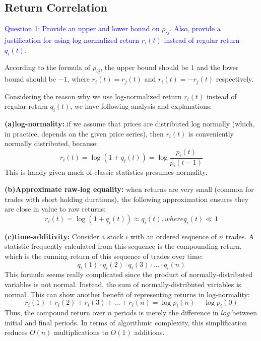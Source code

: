 \documentclass[11pt]{article}
\begin{document}
\subsection{Return Correlation}
\textcolor{blue}{Question 1: Provide an upper and lower bound on $\rho_{ij}$. Also, provide a justification for using log-normalized return $r_i(t)$ instead of regular return $q_i(t)$.}

According to the formula of $\rho_{ij}$, the upper bound should be $1$ and the lower bound should be $-1$, where $r_i(t) = r_j(t)$ and $r_i(t) = -r_j(t)$ respectively.

Considering the reason why we use log-normalized return $r_i(t)$ instead of regular return $q_i(t)$, we have following analysis and explanations:

\textbf{(a)log-normality:} if we assume that prices are distributed log normally (which, in practice, depends on the given price series), then $r_i(t)$ is conveniently normally distributed, because:
\begin{displaymath}r_i(t) = \log(1 + q_i(t)) = \log\frac{p_i(t)}{p_i(t-1)}\end{displaymath}
This is handy given much of classic statistics presumes normality.

\textbf{(b)Approximate raw-log equality:} when returns are very small (common for trades with short holding durations), the following approximation ensures they are close in value to raw returns:
\begin{displaymath}r_i(t) = \log(1 + q_i(t)) \approx q_i(t), where q_i(t)\ll 1\end{displaymath}

\textbf{(c)time-additivity:} Consider a stock $i$ with an ordered sequence of $n$ trades. A statistic frequently calculated from this sequence is the compounding return, which is the running return of this sequence of trades over time:
\begin{displaymath}q_i(1) \cdot q_i(2) \cdot q_i(3) \cdot...\cdot q_i(n)\end{displaymath}
This formula seems really complicated since the product of normally-distributed variables is not normal. Instead, the sum of normally-distributed variables is normal. This can show another benefit of representing returns in log-normality:
\begin{displaymath}r_i(1) + r_i(2) + r_i(3) + ... + r_i(n) =\log p_i(n) - \log p_i(0)\end{displaymath}
Thus, the compound return over $n$ periods is merely the difference in $log$ between initial and final periods. In terms of algorithmic complexity, this simplification reduces $O(n)$ multiplications to $O(1)$ additions. 
\end{document}
